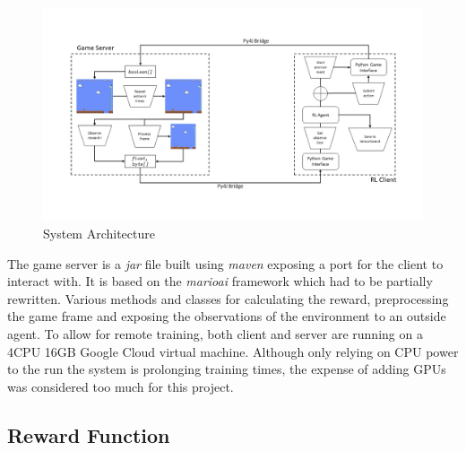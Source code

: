 \documentclass[notitlepage,a4paper,11pt]{article}
\begin{document}
\begin{figure}[!htb]
\centering
\includegraphics[trim={0 2cm 0 2cm},clip,width=1\linewidth]{figs/system_architecture.png}
\caption{System Architecture}
\end{figure}

The game server is a \textit{jar} file built using \textit{maven} exposing a port for the client to interact with. It is based on the \textit{marioai} \cite{marioai} framework which had to be partially rewritten. Various methods and classes for calculating the reward, preprocessing the game frame and exposing the observations of the environment to an outside agent. To allow for remote training, both client and server are running on a 4CPU 16GB Google Cloud virtual machine. Although only relying on CPU power to the run the system is prolonging training times, the expense of adding GPUs was considered too much for this project.


\subsection{Reward Function} \label{reward_function}
\end{document}
